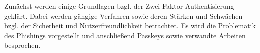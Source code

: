 Zunächst werden einige Grundlagen bzgl. der Zwei-Faktor-Authentisierung  geklärt. 
Dabei werden gängige Verfahren sowie deren Stärken und Schwächen bzgl. der Sicherheit 
und Nutzerfreundlichkeit betrachtet. Es wird die Problematik des Phishings vorgestellt 
und anschließend Passkeys sowie verwandte Arbeiten besprochen. 